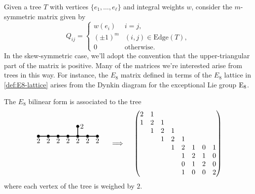 Given a tree $T$ with vertices $\{e_1,\ldots, e_\ell\}$ and integral weights $w$, consider the $m$-symmetric matrix given by
\[
	Q_{ij} = \begin{cases}
		w(e_i)    & i=j,                       \\
		(\pm 1)^m & (i,j)\in \textrm{Edge}(T), \\
		0         & \textrm{otherwise}.
	\end{cases}
\]
In the skew-symmetric case, we'll adopt the convention that the upper-triangular part of the matrix is positive. Many of the matrices we're interested arise from trees in this way. For instance, the $E_8$ matrix defined in terms of the $E_8$ lattice in \cref{def:E8-lattice} arises from the Dynkin diagram for the exceptional Lie group ${\operatorname{E}}_8$.
\begin{proposition}
	The ${E_8}$ bilinear form is associated to the tree
	\[
		\begin{tikzpicture}
			\tikzset{dynode/.style={circle, draw, fill=black,
						minimum size=4pt, inner sep=0pt}}
			\tikzset{dyline/.style={line width=1pt}}
			\tikzset{dydash/.style={line width=1pt, dashed}}

			\begin{scope}[yshift=-10em, xshift=0]
				\node[dynode] (a1) at (0,0) {};
				\node[dynode] (a2) at (0.5,0) {};
				\node[dynode] (a3) at (1,0) {};
				\node[dynode] (a4) at (1.5,0) {};
				\node[dynode] (a5) at (2,0) {};
				\node[dynode] (a6) at (2.5,0) {};
				\node[dynode] (a7) at (3,0) {};
				\node[dynode] (a8) at (2,0.5) {};

				\draw[dyline] (a1) -- (a2) -- (a3) -- (a4) -- (a5) -- (a6) -- (a7);
				\draw[dyline] (a5) -- (a8);

				\node[below] () at (a1) {$2$};
				\node[below] () at (a2) {$2$};
				\node[below] () at (a3) {$2$};
				\node[below] () at (a4) {$2$};
				\node[below] () at (a5) {$2$};
				\node[below] () at (a6) {$2$};
				\node[below] () at (a7) {$2$};
				\node[right] () at (a8) {$2$};
			\end{scope}
		\end{tikzpicture}
		\quad\implies\quad
		\begin{pmatrix}
			2 & 1 &   &   &   &   &   &   \\
			1 & 2 & 1 &   &   &   &   &   \\
			  & 1 & 2 & 1 &   &   &   &   \\
			  &   & 1 & 2 & 1 &   &   &   \\
			  &   &   & 1 & 2 & 1 & 0 & 1 \\
			  &   &   &   & 1 & 2 & 1 & 0 \\
			  &   &   &   & 0 & 1 & 2 & 0 \\
			  &   &   &   & 1 & 0 & 0 & 2 \\
		\end{pmatrix}
	\]
	where each vertex of the tree is weighed by $2$.
\end{proposition}

